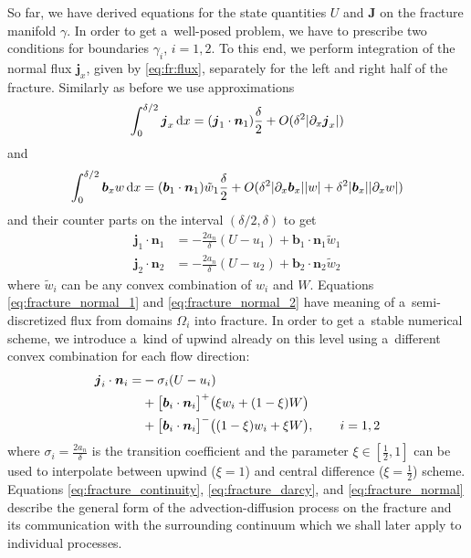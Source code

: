 \documentclass[12pt,a4paper]{report}
\def\prtl{\partial}
\def\vc#1{\mathbf{\boldsymbol{#1}}}     %
\def\abs#1{\lvert#1\rvert}
\def\d {\,{\rm d}}
\begin{document}
So far, we have derived equations for the state quantities $U$ and $\vc J$ on the fracture manifold $\gamma$. In order to
get a~well-posed problem, we have to prescribe two conditions for boundaries $\gamma_i$, $i=1,2$. To this end, we
perform integration of the normal flux $\vc j_x$, given by \eqref{eq:fr:flux}, separately for the left and right half of the fracture.
Similarly as before we use approximations
\[
 \int_0^{\delta/2} \vc j_x \d x = (\vc j_1 \cdot \vc n_1)\frac{\delta}{2} + O(\delta^2 \abs{\prtl_x \vc j_x})
\]
and 
\[
 \int_0^{\delta/2} \vc b_x w \d x = (\vc b_1 \cdot \vc n_1)\tilde{w}_1\frac{\delta}{2} + O(\delta^2 \abs{\prtl_x \vc b_x}\abs{w} + \delta^2\abs{\vc b_x}\abs{\prtl_x w})
\]
and their counter parts on the interval $(\delta/2, \delta)$ to get
\begin{align}
    \label{eq:fracture_normal_1}
     \vc j_1 \cdot \vc n_1 &= -\frac{2a_n}{\delta} (U - u_1) + \vc b_1\cdot \vc n_1 \tilde{w}_1\\
    \label{eq:fracture_normal_2}
    \vc j_2 \cdot \vc n_2 &= -\frac{2a_n}{\delta} (U - u_2) + \vc b_2\cdot \vc n_2 \tilde{w}_2
\end{align}
where $\tilde w_i$ can be any convex combination of $w_i$ and $W$. Equations \eqref{eq:fracture_normal_1}  
and \eqref{eq:fracture_normal_2} have meaning of a~semi-discretized flux from domains $\Omega_i$ into fracture.
In order to get a~stable numerical scheme, we introduce a~kind of upwind already on this level using a~different convex 
combination for each flow direction:
\begin{align}
   \notag 
   \vc j_i \cdot \vc n_i
       = &-\sigma_i (U - u_i)      \\ 
   \notag
      &+ \big[\vc b_i\cdot \vc n_i\big]^{+} \big(\xi w_i + (1-\xi) W\big)       \\
      \label{eq:fracture_normal}
      &+ \big[\vc b_i\cdot \vc n_i\big]^{-} \big((1-\xi) w_i + \xi W\big), \qquad i=1,2
\end{align}
where $\sigma_i = \frac{2a_n}{\delta}$ is the transition coefficient and the parameter $\xi\in [\frac12, 1]$ can be used to interpolate
between upwind ($\xi = 1$) and central difference ($\xi=\frac12$) scheme. Equations \eqref{eq:fracture_continuity}, \eqref{eq:fracture_darcy}, and
\eqref{eq:fracture_normal} describe the general form of the advection-diffusion process on the fracture and its communication with 
the surrounding continuum which we shall later apply to individual processes.



\end{document}
